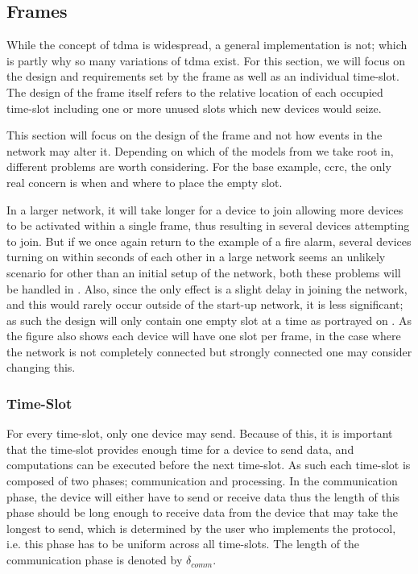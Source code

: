 \subsection{Frames}\label{GCRC:frame}
While the concept of \gls{tdma} is widespread, a general implementation is not; which is partly why so many variations of \gls{tdma} exist.
For this section, we will focus on the design and requirements set by the frame as well as an individual time-slot.
The design of the frame itself refers to the relative location of each occupied time-slot including one or more unused slots which new devices would seize.

This section will focus on the design of the frame and not how events in the network may alter it.
Depending on which of the models from  we take root in, different problems are worth considering.
For the base example, \gls{ccrc}, the only real concern is when and where to place the empty slot.

In a larger network, it will take longer for a device to join allowing more devices to be activated within a single frame, thus resulting in several devices attempting to join.
But if we once again return to the example of a fire alarm, several devices turning on within seconds of each other in a large network seems an unlikely scenario for other than an initial setup of the network, both these problems will be handled in .
Also, since the only effect is a slight delay in joining the network, and this would rarely occur outside of the start-up network, it is less significant; as such the design will only contain one empty slot at a time as portrayed on .
As the figure also shows each device will have one slot per frame, in the case where the network is not completely connected but strongly connected one may consider changing this.


\subsubsection*{Time-Slot}
For every time-slot, only one device may send.
Because of this, it is important that the time-slot provides enough time for a device to send data, and computations can be executed before the next time-slot.
As such each time-slot is composed of two phases; communication and processing.
In the communication phase, the device will either have to send or receive data thus the length of this phase should be long enough to receive data from the device that may take the longest to send, which is determined by the user who implements the protocol, i.e. this phase has to be uniform across all time-slots.
The length of the communication phase is denoted by $\delta_{comm}$.

